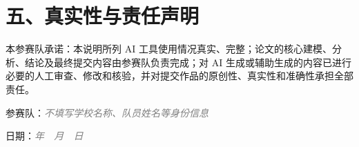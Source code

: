 \documentclass[withoutpreface,bwprint]{cumcmthesis} %
\newcommand{\placeholder}[1]{\textcolor{gray}{\textit{#1}}}
\begin{document}
\section*{五、真实性与责任声明}

本参赛队承诺：本说明所列 AI 工具使用情况真实、完整；论文的核心建模、分析、结论及最终提交内容由参赛队负责完成；对 AI 生成或辅助生成的内容已进行必要的人工审查、修改和核验，并对提交作品的原创性、真实性和准确性承担全部责任。

\vspace{2em}

\begin{flushright}
  参赛队：\placeholder{不填写学校名称、队员姓名等身份信息}\par
  日期：\placeholder{年~~月~~日}
\end{flushright}
\end{document}
